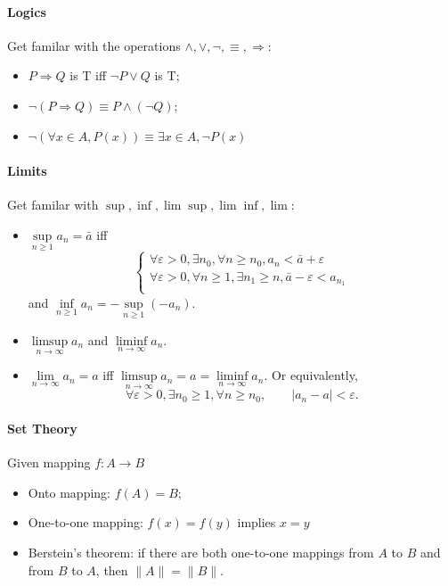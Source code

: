 \paragraph{Logics}
Get familar with the operations $\land,\lor,\lnot,\equiv,\Rightarrow$:
\begin{itemize}
\item
$P\Rightarrow Q$ is T iff $\lnot P\lor Q$ is T;
\item
$\lnot(P\Rightarrow Q)\equiv P\land (\lnot Q)$;
\item
$\lnot (\forall x\in A, P(x)) \equiv \exists x\in A, \lnot P(x)$
\end{itemize}

\paragraph{Limits}
Get familar with $\sup,\inf,\lim\sup,\lim\inf,\lim$:
\begin{itemize}
\item
$\sup\limits_{n\ge 1}a_n=\bar{a}$ iff
\[
\left\{
\begin{aligned}
\forall\varepsilon>0,\exists n_0, \forall n\ge n_0, a_n<\bar{a}+\varepsilon\\
\forall\varepsilon>0,\forall n\ge1, \exists n_1\ge n, \bar{a}-\varepsilon<a_{n_1}\\
\end{aligned}
\right.
\]
and $\inf\limits_{n\ge 1}a_n=-\sup\limits_{n\ge 1}(-a_n)$.
\item
$\limsup\limits_{n\to\infty} a_n$ and $\liminf\limits_{n\to\infty} a_n$.
\item
$\lim\limits_{n\to\infty}a_n=a$ iff $\limsup\limits_{n\to\infty} a_n=a=\liminf\limits_{n\to\infty} a_n$.
Or equivalently,
\[
\forall\varepsilon>0,\exists n_0\ge1, \forall n\ge n_0,
\qquad
|a_n-a|<\varepsilon.
\]
\end{itemize}
\paragraph{Set Theory}
Given mapping $f:A\to B$
\begin{itemize}
\item
Onto mapping: $f(A)=B$;
\item
One-to-one mapping: $f(x)=f(y)$ implies $x=y$
\item
Berstein's theorem:
if there are both one-to-one mappings from $A$ to $B$ 
and from $B$ to $A$, then $\|A\|=\|B\|$.
\end{itemize}

